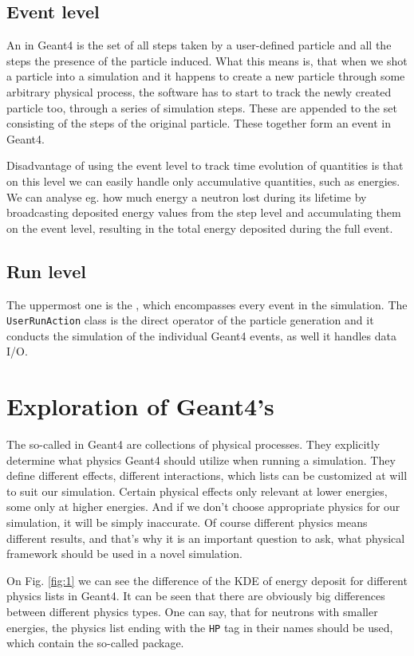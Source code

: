 \begin{multicols}{2}
\subsection{Event level}
An  in Geant4 is the set of all steps taken by a user-defined particle and all the steps the presence of the particle induced. What this means is, that when we shot a particle into a simulation and it happens to create a new particle through some arbitrary physical process, the software has to start to track the newly created particle too, through a series of simulation steps. These are appended to the set consisting of the steps of the original particle. These together form an event in Geant4.

Disadvantage of using the event level to track time evolution of quantities is that on this level we can easily handle only accumulative quantities, such as energies. We can analyse eg. how much energy a neutron lost during its lifetime by broadcasting deposited energy values from the step level and accumulating them on the event level, resulting in the total energy deposited during the full event.

\subsection{Run level}
The uppermost one is the , which encompasses every event in the simulation. The \texttt{UserRunAction} class is the direct operator of the particle generation and it conducts the simulation of the individual Geant4 events, as well it handles data I/O.

\section{Exploration of Geant4's }
The so-called  in Geant4 are collections of physical processes. They explicitly determine what physics Geant4 should utilize when running a simulation. They define different effects, different interactions, which lists can be customized at will to suit our simulation. Certain physical effects only relevant at lower energies, some only at higher energies. And if we don't choose appropriate physics for our simulation, it will be simply inaccurate. Of course different physics means different results, and that's why it is an important question to ask, what physical framework should be used in a novel simulation.
\begin{Figure}
	\centering
	\texttt{[image: \{images/energy\_dist\_full\_concat\_E100.png]}}
	\captionof{figure}{} \label{fig:1}
\end{Figure}
On Fig. \ref{fig:1} we can see the difference of the KDE of energy deposit for different physics lists in Geant4. It can be seen that there are obviously big differences between different physics types. One can say, that for neutrons with smaller energies, the physics list ending with the \texttt{HP} tag in their names should be used, which contain the so-called  package.


\end{multicols}
